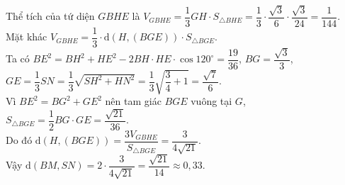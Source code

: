\begin{ex}
{        Thể tích của tứ diện $GBHE$ là $V_{GBHE}=\dfrac{1}{3} GH\cdot S_{\triangle BHE}=\dfrac{1}{3}\cdot\dfrac{\sqrt{3}}{6}\cdot\dfrac{\sqrt{3}}{24}=\dfrac{1}{144}$.\\
        Mặt khác $V_{GBHE}=\dfrac{1}{3}\cdot \mathrm{d}\left(H,\left(BGE\right)\right)\cdot S_{\triangle BGE}$.\\
        Ta có $BE^2=BH^2+HE^2-2BH\cdot HE\cdot\cos 120^{\circ}=\dfrac{19}{36}$, $BG=\dfrac{\sqrt{3}}{3}$,\\ $GE=\dfrac{1}{3} SN=\dfrac{1}{3} \sqrt{SH^2+HN^2}=\dfrac{1}{3} \sqrt{\dfrac{3}{4}+1}=\dfrac{\sqrt{7}}{6}$.\\
        Vì $BE^2=BG^2+GE^2$ nên tam giác $BGE$ vuông tại $G$, $S_{\triangle BGE}=\dfrac{1}{2} BG\cdot GE=\dfrac{\sqrt{21}}{36}$.\\
        Do đó $\mathrm{d}\left(H,\left(BGE\right)\right)=\dfrac{3V_{GBHE}}{S_{\triangle BGE}}=\dfrac{3}{4\sqrt{21}}$.\\
        Vậy $\mathrm{d}\left(BM,SN\right)=2\cdot\dfrac{3}{4\sqrt{21}}=\dfrac{\sqrt{21}}{14} \approx 0{,}33$.
    }
\end{ex}

